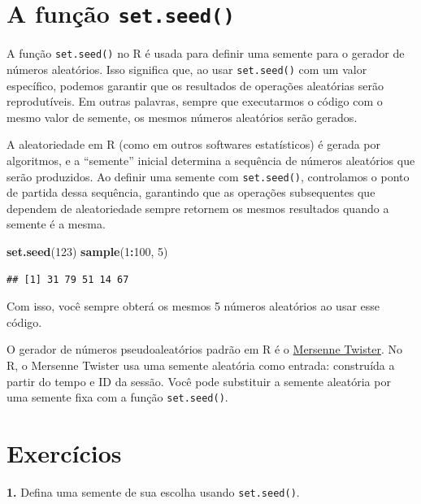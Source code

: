 \documentclass[
]{book}
\newenvironment{Shaded}{\begin{snugshade}}{\end{snugshade}}
\newcommand{\DecValTok}[1]{\textcolor[rgb]{0.00,0.00,0.81}{#1}}
\newcommand{\FunctionTok}[1]{\textcolor[rgb]{0.13,0.29,0.53}{\textbf{#1}}}
\newcommand{\NormalTok}[1]{#1}
\newcommand{\SpecialCharTok}[1]{\textcolor[rgb]{0.81,0.36,0.00}{\textbf{#1}}}
\begin{document}
\section{\texorpdfstring{A função \texttt{set.seed()}}{A função set.seed()}}\label{a-funuxe7uxe3o-set.seed}

A função \texttt{set.seed()} no R é usada para definir uma semente para o gerador de números aleatórios. Isso significa que, ao usar \texttt{set.seed()} com um valor específico, podemos garantir que os resultados de operações aleatórias serão reprodutíveis. Em outras palavras, sempre que executarmos o código com o mesmo valor de semente, os mesmos números aleatórios serão gerados.

A aleatoriedade em R (como em outros softwares estatísticos) é gerada por algoritmos, e a ``semente'' inicial determina a sequência de números aleatórios que serão produzidos. Ao definir uma semente com \texttt{set.seed()}, controlamos o ponto de partida dessa sequência, garantindo que as operações subsequentes que dependem de aleatoriedade sempre retornem os mesmos resultados quando a semente é a mesma.

\begin{Shaded}
\begin{Highlighting}[]
\FunctionTok{set.seed}\NormalTok{(}\DecValTok{123}\NormalTok{)}
\FunctionTok{sample}\NormalTok{(}\DecValTok{1}\SpecialCharTok{:}\DecValTok{100}\NormalTok{, }\DecValTok{5}\NormalTok{)}
\end{Highlighting}
\end{Shaded}

\begin{verbatim}
## [1] 31 79 51 14 67
\end{verbatim}

Com isso, você sempre obterá os mesmos 5 números aleatórios ao usar esse
código.

O gerador de números pseudoaleatórios padrão em R é o \href{https://www.sciencedirect.com/science/article/abs/pii/B9780128093627500108}{Mersenne Twister}. No R, o Mersenne Twister usa uma semente aleatória como entrada: construída a partir do tempo e ID da sessão. Você pode substituir a semente aleatória por uma semente fixa com a função \texttt{set.seed()}.

\section{Exercícios}\label{exercuxedcios-23}

\textbf{1.} Defina uma semente de sua escolha usando \texttt{set.seed()}.
\end{document}
